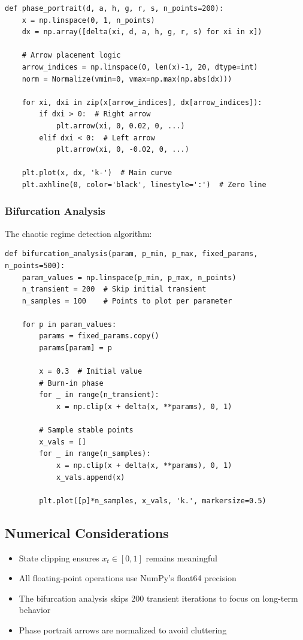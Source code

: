 \documentclass[a4paper, 10pt]{article}
\begin{document}
\begin{verbatim}
def phase_portrait(d, a, h, g, r, s, n_points=200):
    x = np.linspace(0, 1, n_points)
    dx = np.array([delta(xi, d, a, h, g, r, s) for xi in x])
    
    # Arrow placement logic
    arrow_indices = np.linspace(0, len(x)-1, 20, dtype=int)
    norm = Normalize(vmin=0, vmax=np.max(np.abs(dx)))
    
    for xi, dxi in zip(x[arrow_indices], dx[arrow_indices]):
        if dxi > 0:  # Right arrow
            plt.arrow(xi, 0, 0.02, 0, ...)
        elif dxi < 0:  # Left arrow
            plt.arrow(xi, 0, -0.02, 0, ...)
    
    plt.plot(x, dx, 'k-')  # Main curve
    plt.axhline(0, color='black', linestyle=':')  # Zero line
\end{verbatim}

\subsubsection{Bifurcation Analysis}
The chaotic regime detection algorithm:

\begin{verbatim}
def bifurcation_analysis(param, p_min, p_max, fixed_params, n_points=500):
    param_values = np.linspace(p_min, p_max, n_points)
    n_transient = 200  # Skip initial transient
    n_samples = 100    # Points to plot per parameter
    
    for p in param_values:
        params = fixed_params.copy()
        params[param] = p
        
        x = 0.3  # Initial value
        # Burn-in phase
        for _ in range(n_transient):
            x = np.clip(x + delta(x, **params), 0, 1)
        
        # Sample stable points
        x_vals = []
        for _ in range(n_samples):
            x = np.clip(x + delta(x, **params), 0, 1)
            x_vals.append(x)
        
        plt.plot([p]*n_samples, x_vals, 'k.', markersize=0.5)
\end{verbatim}

\subsection{Numerical Considerations}
\begin{itemize}
	\item State clipping ensures $x_t \in [0,1]$ remains meaningful
	\item All floating-point operations use NumPy's float64 precision
	\item The bifurcation analysis skips 200 transient iterations to focus on long-term behavior
	\item Phase portrait arrows are normalized to avoid cluttering
\end{itemize}
\end{document}
